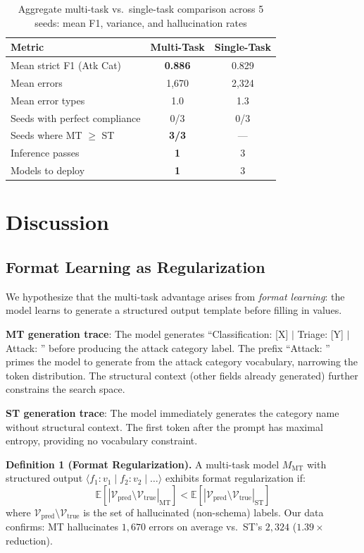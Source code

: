 \documentclass[review,3p]{elsarticle}
\begin{document}
\begin{table}[!ht]
\centering
\caption{Aggregate multi-task vs.\ single-task comparison across 5 seeds: mean F1, variance, and hallucination rates}
\label{tab:aggregate}
\begin{tabular}{lcc}
\toprule
\textbf{Metric} & \textbf{Multi-Task} & \textbf{Single-Task} \\
\midrule
Mean strict F1 (Atk Cat) & \textbf{0.886} & 0.829 \\
Mean errors & 1,670 & 2,324 \\
Mean error types & 1.0 & 1.3 \\
Seeds with perfect compliance & 0/3 & 0/3 \\
Seeds where MT $\geq$ ST & \textbf{3/3} & --- \\
Inference passes & \textbf{1} & 3 \\
Models to deploy & \textbf{1} & 3 \\
\bottomrule
\end{tabular}
\end{table}

\section{Discussion}

\subsection{Format Learning as Regularization}
We hypothesize that the multi-task advantage arises from \emph{format learning}: the model learns to generate a structured output template before filling in values.

\textbf{MT generation trace}: The model generates ``Classification: [X] $|$ Triage: [Y] $|$ Attack: '' before producing the attack category label. The prefix ``Attack: '' primes the model to generate from the attack category vocabulary, narrowing the token distribution. The structural context (other fields already generated) further constrains the search space.

\textbf{ST generation trace}: The model immediately generates the category name without structural context. The first token after the prompt has maximal entropy, providing no vocabulary constraint.

\noindent\textbf{Definition 1 (Format Regularization).} A multi-task model $M_\text{MT}$ with structured output $\langle f_1: v_1 \mid f_2: v_2 \mid \ldots \rangle$ exhibits format regularization if:
\begin{equation}
\mathbb{E}[|\mathcal{V}_\text{pred} \setminus \mathcal{V}_\text{true}|_{\text{MT}}] < \mathbb{E}[|\mathcal{V}_\text{pred} \setminus \mathcal{V}_\text{true}|_{\text{ST}}]
\end{equation}
where $\mathcal{V}_\text{pred} \setminus \mathcal{V}_\text{true}$ is the set of hallucinated (non-schema) labels. Our data confirms: MT hallucinates $1,670$ errors on average vs.\ ST's $2,324$ ($1.39\times$ reduction).
\end{document}
